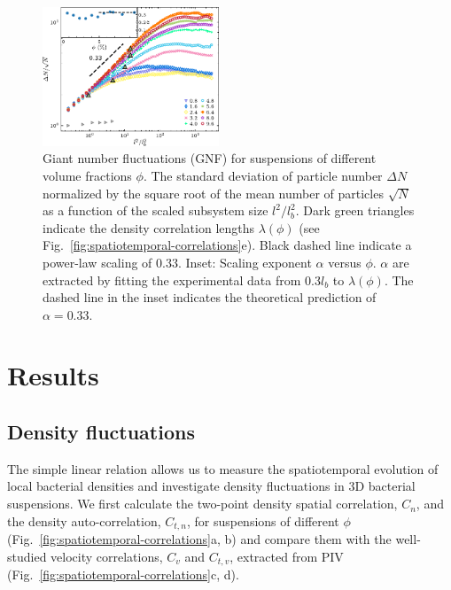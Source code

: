 \documentclass[twocolumn,aps,prx,amsmath,amssymb,longbibliography]{revtex4-2}
\begin{document}
\begin{figure}[t]
\begin{center}
\includegraphics[width=0.47\textwidth]{figures/GNF/v5.pdf}
\caption[Concentration dependence of GNF.]
{
Giant number fluctuations (GNF) for suspensions of different volume fractions $\phi$. The standard deviation of particle number $\Delta N$ normalized by the square root of the mean number of particles $\sqrt N$ as a function of the scaled subsystem size $l^2/l_b^2$. Dark green triangles indicate the density correlation lengths $\lambda(\phi)$ (see Fig.~\ref{fig:spatiotemporal-correlations}e). Black dashed line indicate a power-law scaling of 0.33.
Inset: Scaling exponent $\alpha$ versus $\phi$. $\alpha$ are extracted by fitting the experimental data from 0.3$l_b$ to $\lambda(\phi)$. The dashed line in the inset indicates the theoretical prediction of $\alpha=0.33$.
}
\label{fig:GNF}
\end{center}
\end{figure}

\section{Results}

\subsection{Density fluctuations}

The simple linear relation allows us to measure the spatiotemporal evolution of local bacterial densities and investigate density fluctuations in 3D bacterial suspensions. We first calculate the two-point density spatial correlation, $C_n$, and the density auto-correlation, $C_{t,n}$, for suspensions of different $\phi$ (Fig.~\ref{fig:spatiotemporal-correlations}a, b) and compare them with the well-studied velocity correlations, $C_{v}$ and $C_{t,v}$, extracted from PIV (Fig.~\ref{fig:spatiotemporal-correlations}c, d).
\end{document}
